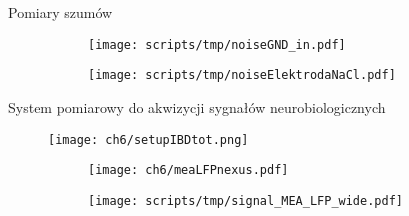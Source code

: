 \begin{frame}{Pomiary szumów}

    \begin{figure}[H]
        \centering
        \begin{subfigure}[b]{0.485\textwidth}
            \centering
            \texttt{[image: scripts/tmp/noiseGND\_in.pdf]}
        \end{subfigure}
        \begin{subfigure}[b]{0.485\textwidth}
            \centering
            \texttt{[image: scripts/tmp/noiseElektrodaNaCl.pdf]}
        \end{subfigure}     
    \end{figure}
\end{frame}



\begin{frame}{System pomiarowy do akwizycji sygnałów neurobiologicznych}
    \begin{figure}[H]
        \centering 
        \texttt{[image: ch6/setupIBDtot.png]}  
    \end{figure}
\end{frame}

\begin{frame}{}
    \begin{figure}[H]
   
   
       \begin{subfigure}{0.25\textwidth}
           \texttt{[image: ch6/meaLFPnexus.pdf]}
        \end{subfigure}
           \hspace{-5em}
        \begin{subfigure}{0.7\textwidth}
           \texttt{[image: scripts/tmp/signal\_MEA\_LFP\_wide.pdf]}
        \end{subfigure}
   \end{figure}
\end{frame}

